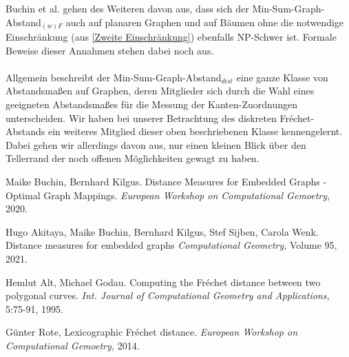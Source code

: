 \documentclass[a4paper, 12pt, twoside]{article}
\theoremstyle{Format1} %
\begin{document}
Buchin et al. gehen des Weiteren davon aus, dass sich der Min-Sum-Graph-Abstand$_{(w)F}$ auch auf planaren Graphen und
auf Bäumen ohne die notwendige Einschränkung (aus \ref{Zweite Einschränkung}) ebenfalls NP-Schwer ist.
Formale Beweise dieser Annahmen stehen dabei noch aus.
\\
\\
Allgemein beschreibt der Min-Sum-Graph-Abstand$_{dist}$ eine ganze Klasse von Abstandsmaßen auf Graphen, deren Mitglieder sich durch die Wahl
eines geeigneten Abstandsmaßes für die Messung der Kanten-Zuordnungen unterscheiden.
Wir haben bei unserer Betrachtung des diskreten Fréchet-Abstands ein weiteres Mitglied dieser oben beschriebenen Klasse kennengelernt.
Dabei gehen wir allerdings davon aus, nur einen kleinen Blick über den Tellerrand der noch offenen Möglichkeiten gewagt zu haben.
\newpage\null\thispagestyle{empty}\newpage

\begin{thebibliography}{4}
		Maike Buchin, Bernhard Kilgus. Distance Measures for Embedded Graphs - Optimal Graph Mappings.
		\textit{European Workshop on Computational Gemoetry,} 2020.

		Hugo Akitaya, Maike Buchin, Bernhard Kilgus, Stef Sijben, Carola Wenk. Distance measures for embedded graphs
		\textit{Computational Geometry,} Volume 95, 2021.

		Hemlut Alt, Michael Godau. Computing the Fréchet distance between two polygonal curves.
		\textit{Int. Journal of Computational Geometry and Applications,} 5:75-91, 1995.

		Günter Rote, Lexicographic Fréchet distance.
		\textit{European Workshop on Computational Gemoetry,} 2014.

\end{thebibliography}


\end{document}
